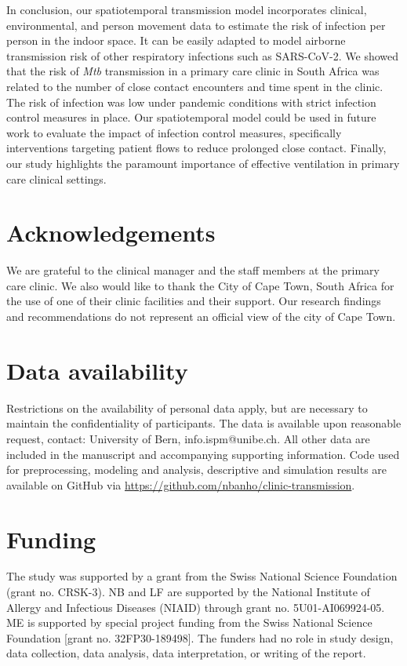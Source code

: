 \documentclass[fleqn,11pt]{wlscirep}
\begin{document}
In conclusion, our spatiotemporal transmission model incorporates clinical, environmental, and person movement data to estimate the risk of infection per person in the indoor space. It can be easily adapted to model airborne transmission risk of other respiratory infections such as SARS-CoV-2. We showed that the risk of \emph{Mtb} transmission in a primary care clinic in South Africa was related to the number of close contact encounters and time spent in the clinic. The risk of infection was low under pandemic conditions with strict infection control measures in place. Our spatiotemporal model could be used in future work to evaluate the impact of infection control measures, specifically interventions targeting patient flows to reduce prolonged close contact. Finally, our study highlights the paramount importance of effective ventilation in primary care clinical settings. 


\newpage


\section*{Acknowledgements}
We are grateful to the clinical manager and the staff members at the primary care clinic. We also would like to thank the City of Cape Town, South Africa for the use of one of their clinic facilities and their support. Our research findings and recommendations do not represent an official view of the city of Cape Town. 

\section*{Data availability}
Restrictions on the availability of personal data apply, but are necessary to maintain the confidentiality of participants. The data is available upon reasonable request, contact: University of Bern, info.ispm@unibe.ch. All other data are included in the manuscript and accompanying supporting information. Code used for preprocessing, modeling and analysis, descriptive and simulation results are available on GitHub via \url{https://github.com/nbanho/clinic-transmission}.

\section*{Funding}
The study was supported by a grant from the Swiss National Science Foundation (grant no. CRSK-3).  NB and LF are supported by the National Institute of Allergy and Infectious Diseases (NIAID) through grant no. 5U01-AI069924-05. ME is supported by special project funding from the Swiss National Science Foundation [grant no. 32FP30-189498]. The funders had no role in study design, data collection, data analysis, data interpretation, or writing of the report.
\end{document}
